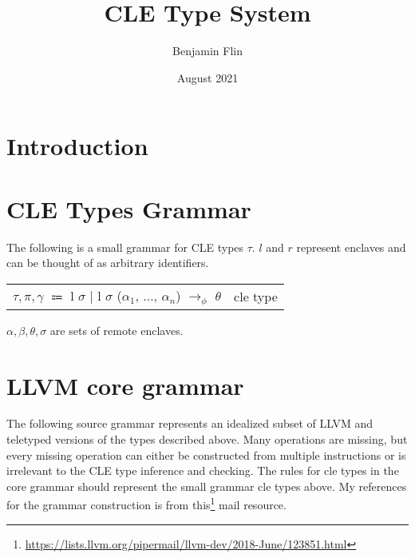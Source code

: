\documentclass{article}
\title{CLE Type System}
\author{Benjamin Flin}
\date{August 2021}
\begin{document}
\maketitle

\section{Introduction}
\section{CLE Types Grammar}
The following is a small grammar for CLE types $\tau$. 
$l$ and $r$ represent enclaves and can be thought of as arbitrary identifiers.

\begin{center}
\begin{tabular}{ l r }
    $\tau, \pi, \gamma$ $\Coloneqq$ l $\sigma$ $\bigl\vert$ l $\sigma$ ($\alpha_1$, $\dots$, $\alpha_n$) $\rightarrow_\phi$ $\theta$ & cle type \\
\end{tabular}
\end{center}

$\alpha, \beta, \theta, \sigma$ are sets of remote enclaves. 

\section{LLVM core grammar}

The following source grammar represents an idealized subset of LLVM and teletyped versions of the types described above. 
Many operations are missing, but every missing operation can either be constructed from multiple instructions or is irrelevant to the CLE type inference and checking. 
The rules for cle types in the core grammar should represent the small grammar cle types above.
My references for the grammar construction is from this\footnote{\url{https://lists.llvm.org/pipermail/llvm-dev/2018-June/123851.html}} mail resource.
\end{document}
